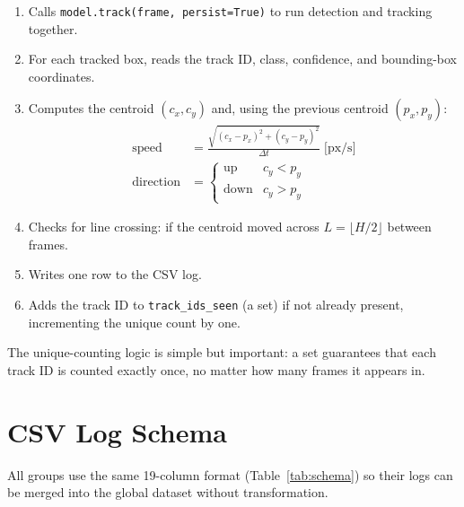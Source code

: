 \documentclass[12pt,a4paper,leqno]{report}
\begin{document}
\begin{enumerate}[label=\arabic*.]
  \item Calls \texttt{model.track(frame, persist=True)} to run detection and tracking together.
  \item For each tracked box, reads the track ID, class, confidence, and bounding-box coordinates.
  \item Computes the centroid $(c_x, c_y)$ and, using the previous centroid $(p_x, p_y)$:
  \begin{align}
    \text{speed} &= \frac{\sqrt{(c_x-p_x)^2+(c_y-p_y)^2}}{\Delta t} \;\text{[px/s]} \\
    \text{direction} &= \begin{cases}\text{up} & c_y < p_y \\ \text{down} & c_y > p_y\end{cases}
  \end{align}
  \item Checks for line crossing: if the centroid moved across $L = \lfloor H/2\rfloor$ between frames.
  \item Writes one row to the CSV log.
  \item Adds the track ID to \texttt{track\_ids\_seen} (a set) if not already present, incrementing the unique count by one.
\end{enumerate}

The unique-counting logic is simple but important: a set guarantees that each track ID is counted exactly once, no matter how many frames it appears in.

\section{CSV Log Schema}

All groups use the same 19-column format (Table~\ref{tab:schema}) so their logs can be merged into the global dataset without transformation.
\end{document}
